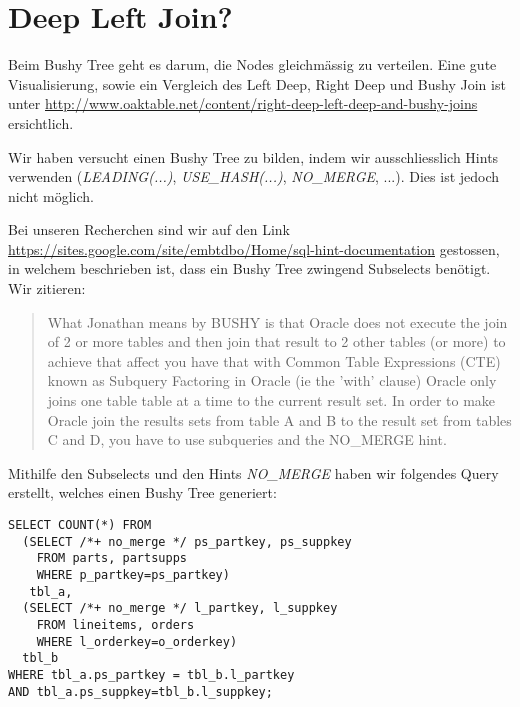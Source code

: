 \documentclass[11pt,a4paper,parskip=half]{scrartcl}
\begin{document}
\section{Deep Left Join?}

Beim Bushy Tree geht es darum, die Nodes gleichmässig zu verteilen. Eine gute Visualisierung, sowie ein Vergleich des Left Deep, Right Deep und Bushy Join ist unter \url{http://www.oaktable.net/content/right-deep-left-deep-and-bushy-joins} ersichtlich.

Wir haben versucht einen Bushy Tree zu bilden, indem wir ausschliesslich Hints verwenden (\emph{LEADING(...)}, \emph{USE\_HASH(...)}, \emph{NO\_MERGE}, ...). Dies ist jedoch nicht möglich.

Bei unseren Recherchen sind wir auf den Link \url{https://sites.google.com/site/embtdbo/Home/sql-hint-documentation} gestossen, in welchem beschrieben ist, dass ein Bushy Tree zwingend Subselects benötigt. Wir zitieren:
\begin{quote}
What Jonathan means by BUSHY is that Oracle does not execute the join of 2 or more tables and  then join that result to 2 other tables (or more) to achieve that affect you have that with Common Table Expressions (CTE) known as Subquery Factoring in Oracle (ie the 'with' clause) Oracle only joins one table table at a time to the current result set. In order to make Oracle join the results sets from table A and B to the result set from tables C and D, you have to use subqueries and the NO\_MERGE hint.
\end{quote}

Mithilfe den Subselects und den Hints \emph{NO\_MERGE} haben wir folgendes Query erstellt, welches einen Bushy Tree generiert:
\begin{lstlisting}
SELECT COUNT(*) FROM
  (SELECT /*+ no_merge */ ps_partkey, ps_suppkey
    FROM parts, partsupps
    WHERE p_partkey=ps_partkey)
   tbl_a,
  (SELECT /*+ no_merge */ l_partkey, l_suppkey
    FROM lineitems, orders
    WHERE l_orderkey=o_orderkey) 
  tbl_b
WHERE tbl_a.ps_partkey = tbl_b.l_partkey
AND tbl_a.ps_suppkey=tbl_b.l_suppkey;
\end{lstlisting}
\end{document}
